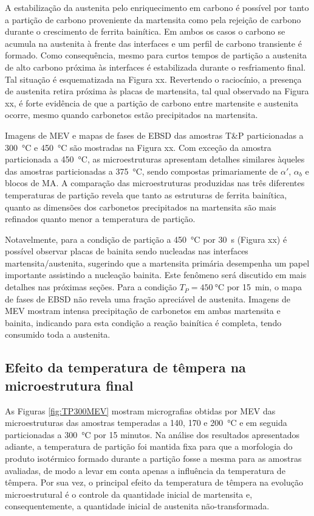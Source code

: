 A estabilização da austenita pelo enriquecimento em carbono é possível por tanto a partição de carbono proveniente da martensita como pela rejeição de carbono durante o crescimento de ferrita bainítica. Em ambos os casos o carbono se acumula na austenita à frente das interfaces e um perfil de carbono transiente é formado. Como consequência, mesmo para curtos tempos de partição a austenita de alto carbono próxima às interfaces é estabilizada durante o resfriamento final. Tal situação é esquematizada na Figura xx. Revertendo o raciocínio, a presença de austenita retira próxima às placas de martensita, tal qual observado na Figura xx, é forte evidência de que a partição de carbono entre martensite e austenita ocorre, mesmo quando carbonetos estão precipitados na martensita.


Imagens de MEV e mapas de fases de EBSD das amostras T\&P particionadas a \SI{300}{\degreeCelsius} e \SI{450}{\degreeCelsius} são mostradas na Figura xx. Com exceção da amostra particionada a \SI{450}{\degreeCelsius}, as microestruturas apresentam detalhes similares àqueles das amostras particionadas a \SI{375}{\degreeCelsius}, sendo compostas primariamente de $\alpha'$, $\alpha_b$ e blocos de MA. A comparação das microestruturas produzidas nas três diferentes temperaturas de partição revela que tanto as estruturas de ferrita bainítica, quanto as dimensões dos carbonetos precipitados na martensita são mais refinados quanto menor a temperatura de partição. 

Notavelmente, para a condição de partição a \SI{450}{\degreeCelsius} por 30~s (Figura xx) é possível observar placas de bainita sendo nucleadas nas interfaces martensita/austenita, sugerindo que a martensita primária desempenha um papel importante assistindo a nucleação bainita. Este fenômeno será discutido em mais detalhes nas próximas seções. Para a condição $T_P = \SI{450}{\degreeCelsius}$ por 15~min, o mapa de fases de EBSD não revela uma fração apreciável de austenita. Imagens de MEV mostram intensa precipitação de carbonetos em ambas martensita e bainita, indicando para esta condição a reação bainítica é completa, tendo consumido toda a austenita.

\subsection{Efeito da temperatura de têmpera na microestrutura final}

\label{sec:micros_TT}

As Figuras \ref{fig:TP300MEV} mostram micrografias obtidas por MEV das microestruturas das amostras temperadas a 140, 170 e \SI{200}{\degreeCelsius} e em seguida particionadas a \SI{300}{\degreeCelsius} por 15 minutos. Na análise dos resultados apresentados adiante, a temperatura de partição foi mantida fixa para que a morfologia do produto isotérmico formado durante a partição fosse a mesma para as amostras avaliadas, de modo a levar em conta apenas a influência da temperatura de têmpera. Por sua vez, o principal efeito da temperatura de têmpera na evolução microestrutural é o controle da quantidade inicial de martensita e, consequentemente, a quantidade inicial de austenita não-transformada.

